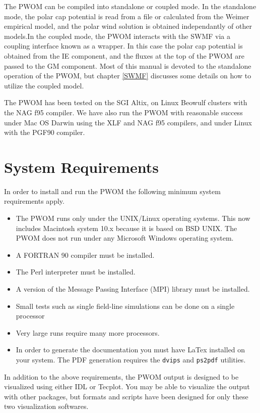 The PWOM can be compiled into standalone or coupled mode. In the standalone 
mode, the polar cap potential is read from a file or calculated from the 
Weimer empirical model, and the polar wind solution is obtained independantly 
of other models.In the coupled mode, the PWOM interacts with the SWMF 
via a coupling interface known as a wrapper. In this case the polar 
cap potential is obtained from the IE component, and the fluxes at the top 
of the PWOM are passed to the GM component. Most of this manual is devoted to 
the standalone operation of the PWOM, but chapter \ref{SWMF} discusses some 
details on how to utilize the coupled model.



The PWOM has been tested on the SGI Altix, on Linux Beowulf clusters with the 
NAG f95 compiler. We have also run the PWOM with reasonable success under
Mac OS Darwin using the XLF and NAG f95 compilers, and under Linux with
the PGF90 compiler.

\section{System Requirements}

In order to install and run the PWOM the following minimum system
requirements apply.

\begin{itemize}
\item The PWOM runs only under the UNIX/Linux operating systems.  This now
  includes Macintosh system 10.x because it is based on BSD UNIX.  The
  PWOM does not run under any Microsoft Windows operating system.
\item A FORTRAN 90 compiler must be installed.
\item The Perl interpreter must be installed.
\item A version of the Message Passing Interface (MPI) library must be
  installed.
\item Small tests such as single  field-line simulations can be done on a 
  single processor
\item Very large runs require many more processors.
\item In order to generate the documentation you must have LaTex installed on
your system.  The PDF generation requires the {\tt dvips} and {\tt ps2pdf}
utilities. 

\end{itemize}


In addition to the above requirements, the PWOM output is designed to
be visualized using either IDL or Tecplot.  You may be able to
visualize the output with other packages, but formats and scripts have
been designed for only these two visualization softwares.


